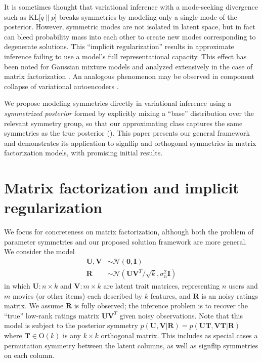 \documentclass{article}
\newcommand{\N}{\mathcal{N}}
\renewcommand{\O}{\text{O}}
\renewcommand{\v}[1]{\mathbf{#1}}
\newcommand{\I}{\v{I}}
\begin{document}
It is sometimes thought that variational inference with a mode-seeking
divergence such as KL[$q\|p$] breaks symmetries by modeling only a
single mode of the posterior. However, symmetric modes are not isolated in latent space, but
in fact can bleed probability mass into each other to create new modes corresponding to degenerate
solutions. This ``implicit regularization'' results in approximate
inference failing to use a model's full representational capacity. This effect has been noted for
Gaussian mixture models \citep{mackay2001local} and analyzed
extensively in the case of matrix factorization
\citep{nakajima2010implicit,nakajima2013global}. An analogous phenomenon may be
observed in component collapse of variational autoencoders
\citep{dinh2014cifar, burda2015importance}. 

We propose modeling symmetries directly in variational inference using a {\em symmetrized
  posterior} formed by explicitly mixing a ``base'' 
distribution over the relevant symmetry group, so that our approximating
class captures the same symmetries as the true posterior
(). This paper 
presents our general framework and demonstrates its application to
signflip and orthogonal symmetries in matrix factorization models,
with promising initial results.

\section{Matrix factorization and implicit regularization}

We focus for concreteness on matrix factorization, although both the problem of parameter symmetries and our
proposed solution framework are more general. We consider the model
\begin{align*}
\v{U}, \v{V} &\sim \N(\v{0}, \I) \\
\v{R} & \sim \N(\v{U}\v{V}^T / \sqrt{k}, \sigma^2_n \I)
\end{align*}
in which $\v{U}: n \times k$ and $\v{V}: m \times k$ are latent trait
matrices, representing $n$ users and $m$ movies
(or other items) each described by $k$ features, and $\v{R}$ is an
noisy ratings matrix. We assume $\v{R}$ is fully
observed; the inference problem is to recover the ``true'' low-rank
ratings matrix $\v{U}\v{V}^T$ given noisy observations. Note that this model
is subject to the posterior symmetry $p(\v{U}, \v{V} | \v{R}) = p(\v{U}\v{T}, \v{V}\v{T} | \v{R})$
where $\v{T}\in \O(k)$ is any $k \times k$ orthogonal matrix. This includes
as special cases a permutation symmetry between the latent columns, as
well as signflip symmetries on each column.
\end{document}
